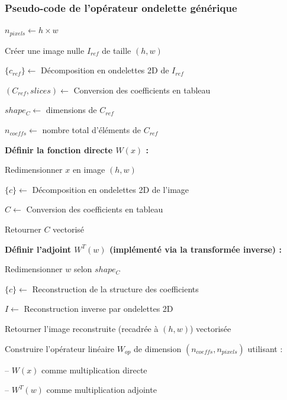 \subsubsection{Pseudo-code de l'opérateur ondelette générique}
\begin{algorithm}[H]
\caption{Création de l'opérateur ondelette ($W$) et de son adjoint ($W^T$)}

$n_{pixels} \leftarrow h \times w$\;

Créer une image nulle $I_{ref}$ de taille $(h,w)$\;

$\{c_{ref}\} \leftarrow$ Décomposition en ondelettes 2D de $I_{ref}$\;

$(C_{ref}, slices) \leftarrow$ Conversion des coefficients en tableau\;

$shape_C \leftarrow$ dimensions de $C_{ref}$\;

$n_{coeffs} \leftarrow$ nombre total d'éléments de $C_{ref}$\;

\vspace{0.3cm}
\textbf{Définir la fonction directe $W(x)$ :}

\Indp
Redimensionner $x$ en image $(h,w)$\;

$\{c\} \leftarrow$ Décomposition en ondelettes 2D de l'image\;

$C \leftarrow$ Conversion des coefficients en tableau\;

Retourner $C$ vectorisé\;
\Indm

\vspace{0.3cm}
\textbf{Définir l'adjoint $W^T(w)$ (implémenté via la transformée inverse) :}

\Indp
Redimensionner $w$ selon $shape_C$\;

$\{c\} \leftarrow$ Reconstruction de la structure des coefficients\;

$I \leftarrow$ Reconstruction inverse par ondelettes 2D\;

Retourner l'image reconstruite (recadrée à $(h,w)$) vectorisée\;
\Indm

\vspace{0.3cm}
Construire l'opérateur linéaire $W_{op}$ de dimension 
$(n_{coeffs}, n_{pixels})$ utilisant :

\Indp
\quad -- $W(x)$ comme multiplication directe\;

\quad -- $W^T(w)$ comme multiplication adjointe\;
\Indm

\;
\end{algorithm}

